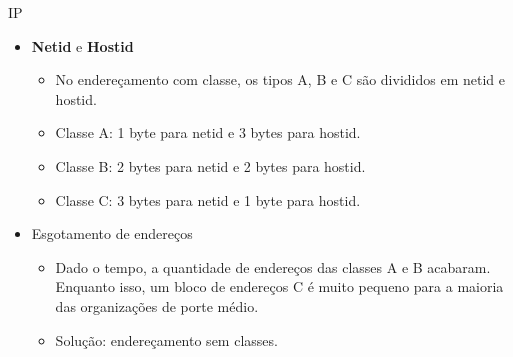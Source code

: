\documentclass{libs/ufc_format}
\begin{document}
\begin{frame}{IP}
    \begin{itemize}
        \justifying
        \item \textbf{Netid} e \textbf{Hostid}
            \begin{itemize}
                \justifying
                \item No endereçamento com classe, os tipos A, B e C são divididos em netid e hostid.
                \item Classe A: 1 byte para netid e 3 bytes para hostid.
                \item Classe B: 2 bytes para netid e 2 bytes para hostid.
                \item Classe C: 3 bytes para netid e 1 byte para hostid.
            \end{itemize}
        \item Esgotamento de endereços
            \begin{itemize}
                \justifying
                \item Dado o tempo, a quantidade de endereços das classes A e B acabaram. Enquanto isso, um bloco de endereços C é muito pequeno para a maioria das organizações de porte médio.
                \item<2> Solução: endereçamento sem classes.
            \end{itemize}
    \end{itemize}
\end{frame}
\end{document}
